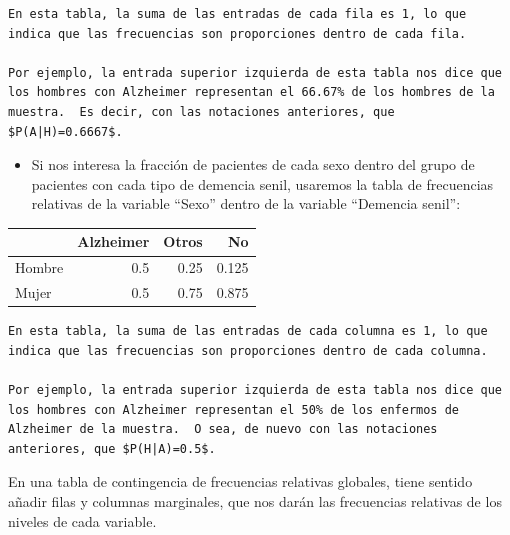 \documentclass[
]{book}
\providecommand{\tightlist}{%
  \setlength{\itemsep}{0pt}\setlength{\parskip}{0pt}}
\theoremstyle{definition}
\theoremstyle{definition}
\theoremstyle{definition}
\theoremstyle{definition}
\theoremstyle{remark}
\begin{document}
\begin{verbatim}
En esta tabla, la suma de las entradas de cada fila es 1, lo que indica que las frecuencias son proporciones dentro de cada fila.

Por ejemplo, la entrada superior izquierda de esta tabla nos dice que los hombres con Alzheimer representan el 66.67% de los hombres de la muestra.  Es decir, con las notaciones anteriores, que $P(A|H)=0.6667$.   
\end{verbatim}

\begin{itemize}
\tightlist
\item
  Si nos interesa la fracción de pacientes de cada sexo dentro del grupo de pacientes con cada tipo de demencia senil, usaremos la tabla de frecuencias relativas de la variable ``Sexo'' dentro de la variable ``Demencia senil'':
\end{itemize}

\begin{tabular}{l|r|r|r}
\hline
  & Alzheimer & Otros & No\\
\hline
Hombre & 0.5 & 0.25 & 0.125\\
\hline
Mujer & 0.5 & 0.75 & 0.875\\
\hline
\end{tabular}

\begin{verbatim}
En esta tabla, la suma de las entradas de cada columna es 1, lo que indica que las frecuencias son proporciones dentro de cada columna.

Por ejemplo, la entrada superior izquierda de esta tabla nos dice que  los hombres con Alzheimer representan el 50% de los enfermos de Alzheimer de la muestra.  O sea, de nuevo con las notaciones anteriores, que $P(H|A)=0.5$.   
\end{verbatim}

En una tabla de contingencia de frecuencias relativas globales, tiene sentido añadir filas y columnas marginales, que nos darán las frecuencias relativas de los niveles de cada variable.
\end{document}
